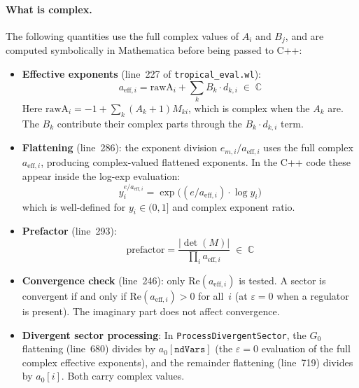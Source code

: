 \documentclass[11pt,a4paper]{article}
\begin{document}
\paragraph{What is complex.}
The following quantities use the full complex values of $A_i$ and $B_j$, and
are computed symbolically in Mathematica before being passed to C++:
\begin{itemize}
  \item \textbf{Effective exponents} (line~227 of \texttt{tropical\_eval.wl}):
    \begin{equation}
    a_{\mathrm{eff},i} = \mathrm{rawA}_i + \sum_k B_k \cdot d_{k,i} \;\in\; \mathbb{C}
    \end{equation}
    Here $\mathrm{rawA}_i = -1 + \sum_k (A_k + 1) M_{ki}$, which is complex when the $A_k$ are.
    The $B_k$ contribute their complex parts through the $B_k \cdot d_{k,i}$ term.

  \item \textbf{Flattening} (line~286): the exponent division $e_{m,i} / a_{\mathrm{eff},i}$
    uses the full complex $a_{\mathrm{eff},i}$, producing complex-valued flattened exponents.
    In the C++ code these appear inside the log-exp evaluation:
    \begin{equation}
    y_i^{e/a_{\mathrm{eff},i}} = \exp\!\bigl((e/a_{\mathrm{eff},i}) \cdot \log y_i\bigr)
    \end{equation}
    which is well-defined for $y_i \in (0,1]$ and complex exponent ratio.

  \item \textbf{Prefactor} (line~293):
    \begin{equation}
    \mathrm{prefactor} = \frac{|\det(M)|}{\prod_i a_{\mathrm{eff},i}} \;\in\; \mathbb{C}
    \end{equation}

  \item \textbf{Convergence check} (line~246): only $\mathrm{Re}(a_{\mathrm{eff},i})$ is tested.
    A sector is convergent if and only if $\mathrm{Re}(a_{\mathrm{eff},i}) > 0$ for all~$i$
    (at $\varepsilon = 0$ when a regulator is present). The imaginary part does not affect convergence.

  \item \textbf{Divergent sector processing}: In \texttt{ProcessDivergentSector}, the
    $G_0$ flattening (line~680) divides by $a_0[\texttt{ndVars}]$ (the $\varepsilon = 0$
    evaluation of the full complex effective exponents), and the remainder
    flattening (line~719) divides by $a_0[i]$. Both carry complex values.
\end{itemize}
\end{document}
